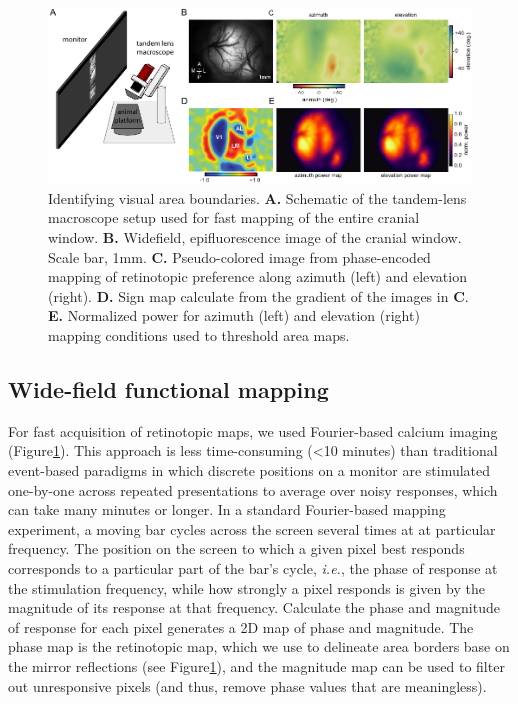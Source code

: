 \begin{figure}
    \includegraphics[width=\textwidth]{figures/chapter_2/fig_2-5_retino_mapping/fig_2-5_retino_mapping.pdf}
    \vspace{.1in}
    \caption[Wide-field mapping]{Identifying visual area boundaries. 
    \textbf{A.} Schematic of the tandem-lens macroscope setup used for fast mapping of the entire cranial window. 
    \textbf{B.} Widefield, epifluorescence image of the cranial window. Scale bar, 1mm.
    \textbf{C.} Pseudo-colored image from phase-encoded mapping of retinotopic preference along azimuth (left) and elevation (right). 
    \textbf{D.} Sign map calculate from the gradient of the images in \textbf{C}. \textbf{E.} Normalized power for azimuth (left) and elevation (right) mapping conditions used to threshold area maps. 
    \label{fig:retino_mapping}}
\end{figure}

\subsection{Wide-field functional mapping}
For fast acquisition of retinotopic maps, we used Fourier-based calcium imaging\cite{Kalatsky2003} (Figure\ref{fig:retino_mapping}). This approach is less time-consuming (<10 minutes) than traditional event-based paradigms in which discrete positions on a monitor are stimulated one-by-one across repeated presentations to average over noisy responses, which can take many minutes or longer. In a standard Fourier-based mapping experiment, a moving bar cycles across the screen several times at at particular frequency. The position on the screen to which a given pixel best responds corresponds to a particular part of the bar's cycle, \textit{i.e.}, the phase of response at the stimulation frequency, while how strongly a pixel responds is given by the magnitude of its response at that frequency. Calculate the phase and magnitude of response for each pixel generates a 2D map of phase and magnitude. The phase map is the retinotopic map, which we use to delineate area borders base on the mirror reflections (see Figure\ref{fig:retino_mapping}), and the magnitude map can be used to filter out unresponsive pixels (and thus, remove phase values that are meaningless). 

